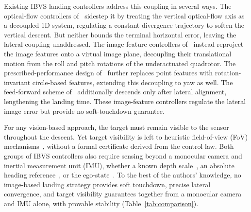 \documentclass{IEEEtaes}
\theoremstyle{definition}
\theoremstyle{remark}
\begin{document}
Existing IBVS landing controllers address this coupling in several ways. The optical-flow controllers of~\cite{herisse2012,ho2018} sidestep it by treating the vertical optical-flow axis as a decoupled 1D system, regulating a constant divergence trajectory to soften the vertical descent. But neither bounds the terminal horizontal error, leaving the lateral coupling unaddressed. The image-feature controllers of~\cite{lin2023,cho2022} instead reproject the image features onto a virtual image plane, decoupling their translational motion from the roll and pitch rotations of the underactuated quadrotor. The prescribed-performance design of~\cite{lin2023} further replaces point features with rotation-invariant circle-based features, extending this decoupling to yaw as well. The feed-forward scheme of~\cite{cho2022} additionally descends only after lateral alignment, lengthening the landing time. These image-feature controllers regulate the lateral image error but provide no soft-touchdown guarantee.

For any vision-based approach, the target must remain visible to the sensor throughout the descent. Yet target visibility is left to heuristic field-of-view (FoV) mechanisms~\cite{angelis2026}, without a formal certificate derived from the control law. Both groups of IBVS controllers also require sensing beyond a monocular camera and inertial measurement unit (IMU), whether a known depth scale~\cite{cho2022}, an absolute heading reference~\cite{herisse2012}, or the ego-state~\cite{lin2023,cho2022}. To the best of the authors' knowledge, no image-based landing strategy provides soft touchdown, precise lateral convergence, and target visibility guarantees together from a monocular camera and IMU alone, with provable stability (Table~\ref{tab:comparison}).
\end{document}
